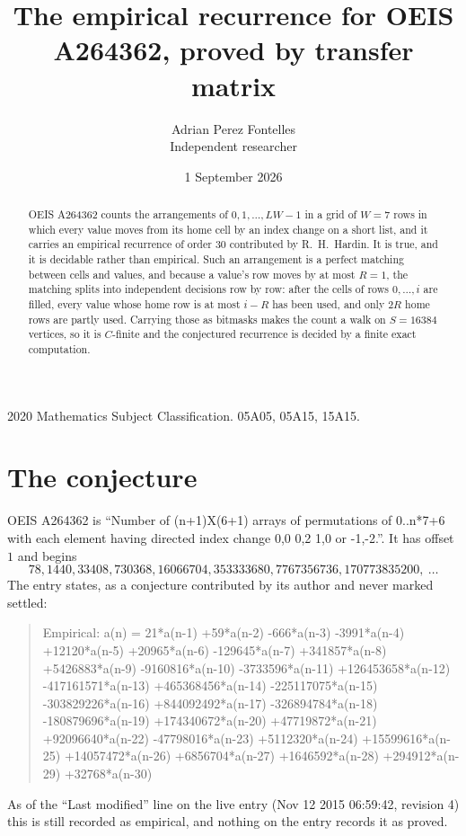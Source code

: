 \documentclass[11pt,a4paper]{article}
\title{The empirical recurrence for OEIS A264362, proved by transfer matrix}
\author{Adrian Perez Fontelles\\ \small Independent researcher}
\date{1 September 2026}
\theoremstyle{plain}
\theoremstyle{definition}
\begin{document}
\maketitle

\begin{abstract}
OEIS A264362 counts the arrangements of $0,1,\dots,LW-1$ in a grid of $W=7$ rows in which
every value moves from its home cell by an index change on a short list, and it carries an
empirical recurrence of order $30$ contributed by R.~H.~Hardin. It is true, and it is
decidable rather than empirical. Such an arrangement is a perfect matching between cells and
values, and because a value's row moves by at most $R=1$, the matching splits into
independent decisions row by row: after the cells of rows $0,\dots,i$ are filled,
every value whose home row is at most $i-R$ has been used, and only $2R$ home rows are
partly used. Carrying those as bitmasks makes the count a walk on $S=16384$ vertices, so it is
$C$-finite and the conjectured recurrence is decided by a finite exact computation.
\end{abstract}

\noindent\small 2020 Mathematics Subject Classification. 05A05, 05A15, 15A15.\normalsize

\section{The conjecture}

OEIS A264362 is ``Number of (n+1)X(6+1) arrays of permutations of 0..n*7+6 with each element having directed index change 0,0 0,2 1,0 or -1,-2.''. It has offset $1$ and begins
\[
78, 1440, 33408, 730368, 16066704, 353333680, 7767356736, 170773835200,\ \dots
\]
The entry states, as a conjecture contributed by its author and never marked settled:
\begin{quote}
Empirical: a(n) = 21*a(n-1) +59*a(n-2) -666*a(n-3) -3991*a(n-4) +12120*a(n-5) +20965*a(n-6) -129645*a(n-7) +341857*a(n-8) +5426883*a(n-9) -9160816*a(n-10) -3733596*a(n-11) +126453658*a(n-12) -417161571*a(n-13) +465368456*a(n-14) -225117075*a(n-15) -303829226*a(n-16) +844092492*a(n-17) -326894784*a(n-18) -180879696*a(n-19) +174340672*a(n-20) +47719872*a(n-21) +92096640*a(n-22) -47798016*a(n-23) +5112320*a(n-24) +15599616*a(n-25) +14057472*a(n-26) +6856704*a(n-27) +1646592*a(n-28) +294912*a(n-29) +32768*a(n-30)
\end{quote}
As of the ``Last modified'' line on the live entry (Nov 12 2015 06:59:42, revision 4) this is still
recorded as empirical, and nothing on the entry records it as proved.
\end{document}
